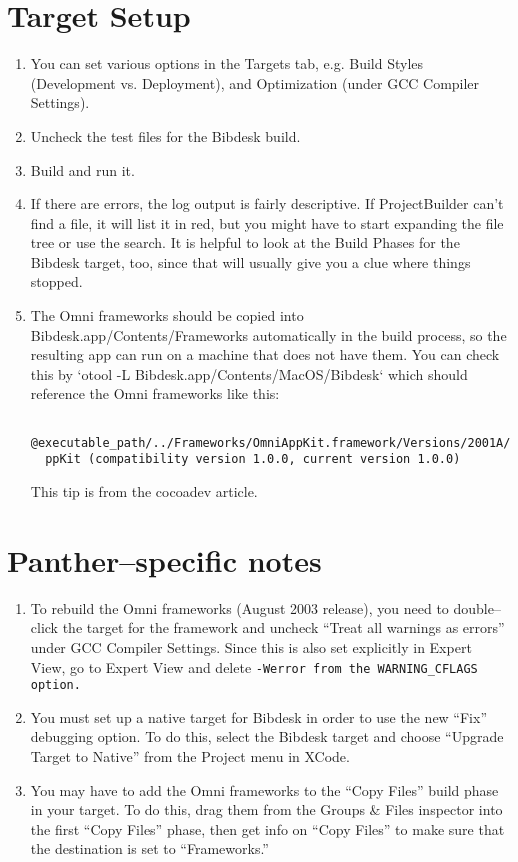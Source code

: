 \documentclass[11pt]{article}
\begin{document}
\section{Target Setup}
\begin{enumerate}
\item You can set various options in the Targets tab, e.g. Build Styles (Development vs. Deployment),
and Optimization (under GCC Compiler Settings).
\item Uncheck the test files for the Bibdesk build.
\item Build and run it.
\item If there are errors, the log output is fairly descriptive.  If ProjectBuilder can't find a
file, it will list it in red, but you might have to start expanding the file tree or use the
search.  It is helpful to look at the Build Phases for the Bibdesk target, too, since that will
usually give you a clue where things stopped.
\item The Omni frameworks should be copied into Bibdesk.app/Contents/Frameworks automatically in the
build process, so the resulting app can run on a machine that does not have them.  You can check
this by `otool -L Bibdesk.app/Contents/MacOS/Bibdesk` which should reference the Omni frameworks
like this:  \begin{verbatim}
  @executable_path/../Frameworks/OmniAppKit.framework/Versions/2001A/OmniA
  ppKit (compatibility version 1.0.0, current version 1.0.0)
\end{verbatim}  This tip is from the cocoadev article.
\end{enumerate}

\section{Panther--specific notes}
\begin{enumerate}
\item To rebuild the Omni frameworks (August 2003 release), you need to double--click the
target for the framework and uncheck ``Treat all warnings as errors'' under GCC Compiler
Settings.  Since this is also set explicitly in Expert View, go to Expert View and delete
\tt{-Werror} \rm from the \tt WARNING\_CFLAGS \rm option.
\item You must set up a native target for Bibdesk in order to use the new ``Fix'' debugging
option.  To do this, select the Bibdesk target and choose ``Upgrade Target to Native'' from
the Project menu in XCode.
\item You may have to add the Omni frameworks to the ``Copy Files'' build phase in your
target.  To do this, drag them from the Groups \& Files inspector into the first ``Copy
Files'' phase, then get info on ``Copy Files'' to make sure that the destination is set to
``Frameworks.''
\end{enumerate}


 
\end{document}
